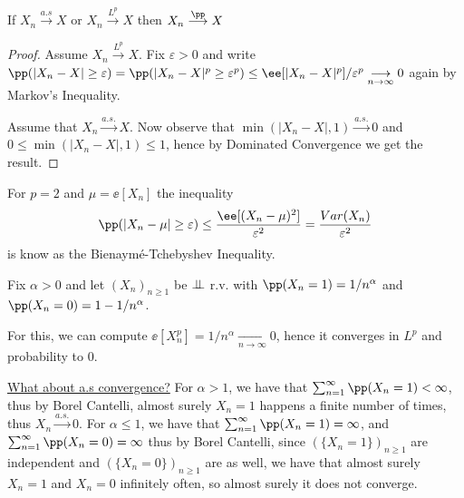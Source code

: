\documentclass[../main.tex]{subfiles}
\begin{document}
   \begin{proposition}
       If $X_n \overset{a.s}{\longrightarrow} X$ or $X_n
       \overset{L^p}{\longrightarrow} X$ then $X_n
       \overset{\pp}{\longrightarrow} X$
   \end{proposition}
   \begin{proof}
       Assume $X_n \overset{L^p}{\longrightarrow} X$. Fix $\varepsilon>0$ and
       write $\pp(|X_n - X| \geq \varepsilon) = \pp(|X_n - X|^p \geq
       \varepsilon^p) \leq \ee[|X_n - X|^p] / \varepsilon^p \underset{n \to
       \infty}{\longrightarrow}0$ again by Markov's Inequality.

       \vspace{1em}
       \noindent
       Assume that $X_n \overset{a.s.}{\longrightarrow} X$. Now observe that
       $\min(|X_n - X|, 1) \overset{a.s.}{\longrightarrow} 0$ and $0 \leq
       \min(|X_n - X|, 1) \leq 1$, hence by Dominated Convergence we get the
       result.
   \end{proof}
   \begin{remark}
     For $p = 2$ and $\mu = \ee[X_n]$
     the inequality
       \[
         \pp(|X_n - \mu| \geq \varepsilon) \leq \frac{\ee[(X_n -
        \mu)^2]}{\varepsilon^2} = \frac{Var(X_n)}{\varepsilon^2}
       \]
       is know as the Bienaymé-Tchebyshev Inequality.
   \end{remark}
   \begin{example}
     Fix $\alpha > 0$ and let $(X_n)_{n \geq 1}$ be $\perp\!\!\!\!\,\perp$ r.v. with
     $\pp(X_n=1) = 1/n^\alpha$ and $\pp(X_n = 0) = 1 - 1/n^\alpha$.

     \vspace{1em}

     \noindent
     For this, we can compute $\ee[X_n^p] = 1/n^\alpha \underset{n \to
     \infty}{\longrightarrow} 0$, hence it converges in $L^p$ and probability
     to $0$.
     
     \vspace{0.5em}
     \noindent\underline{What about a.s convergence?}
     \newline
     For $\alpha > 1$, we have that $\sum_{n=1}^\infty \pp(X_n = 1) < \infty$,
     thus by Borel Cantelli, almost surely $X_n = 1$ happens a finite number
     of times, thus $X_n \overset{a.s.}{\longrightarrow}0$.
     \newline
     For $\alpha \leq 1$, we have that $\sum_{n=1}^\infty \pp(X_n = 1) =
     \infty$, and $\sum_{n = 1}^\infty \pp(X_n = 0) = \infty$
     thus by Borel Cantelli, since $(\{ X_n = 1 \})_{n \geq 1}$ are
     independent and $(\{ X_n = 0 \})_{n \geq 1}$ are as well, we have 
     that almost surely $X_n = 1$ and $X_n = 0$ infinitely often, so almost
     surely it does not converge.
   \end{example}
\end{document}
